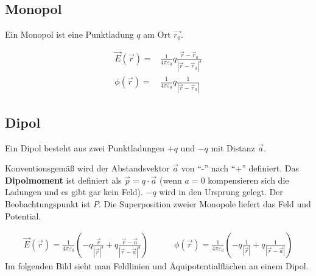   \subsection{Monopol}
  Ein Monopol ist eine Punktladung $q$ am Ort $\vec{r_0}$.\\
	  \begin{minipage}{0.5\textwidth}
		  
	  \end{minipage}
	  \begin{minipage}{0.5\textwidth}
		  \begin{align}
			  \vec{E}(\vec{r} ) = & \frac{1}{4\pi\varepsilon_0} q\frac{\vec{r} -\vec{r} _0}{|\vec{r} -\vec{r} _0|^3} \\
			  \phi (\vec{r} ) =   & \frac{1}{4\pi\varepsilon_0} q\frac{1}{|\vec{r} -\vec{r} _0|}
		  \end{align}
	  \end{minipage}
  \subsection{Dipol}\label{Dipol}
  Ein Dipol besteht aus zwei Punktladungen $+q$ und $-q$ mit Distanz $\vec{a}$.\\
	  \begin{minipage}{0.5\textwidth}
		  
	  \end{minipage}
	  \begin{minipage}{0.5\textwidth}
			  Konventionsgemäß wird der Abstandsvektor $\vec{a}$ von \enquote{-} nach \enquote{+} definiert. Das \textbf {Dipolmoment} ist definiert als $\vec{p} = q\cdot\vec{a}$ (wenn $a=0$ kompensieren sich die Ladungen und es gibt gar kein Feld). $-q$ wird in den Ursprung gelegt. Der Beobachtungspunkt ist $P$. Die Superposition zweier Monopole liefert das Feld und Potential.
	  \end{minipage}

	  \begin{equation}\begin{split}
			  \vec{E}(\vec{r} ) =  \frac{1}{4\pi\varepsilon_0} \left( -q\frac{\vec{r} }{|\vec{r} |^3}  + q\frac{\vec{r} -\vec{a}}{|\vec{r} -\vec{a}|^3}  \right) \quad\quad\quad \phi (\vec{r} ) =  \frac{1}{4\pi\varepsilon_0} \left( -q\frac{1}{|\vec{r} |}  + q\frac{1}{|\vec{r} -\vec{a}|} \right)
		  \end{split}\end{equation}
	  Im folgenden Bild sieht man Feldlinien und Äquipotentialflächen an einem Dipol.
	  \begin{center}
		  \resizebox{0.5\textwidth}{!}{

			  
		  }
	  \end{center}
